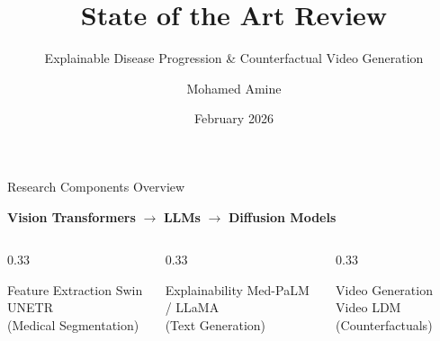 \documentclass[aspectratio=169]{beamer}
\title[State of the Art]{State of the Art Review}
\subtitle{Explainable Disease Progression \& Counterfactual Video Generation}
\author{Mohamed Amine}
\institute{TÉLUQ University $\cdot$ Mitacs Globalink}
\date{February 2026}
\begin{document}
\begin{frame}
    \titlepage
\end{frame}

\begin{frame}{Research Components Overview}
    \begin{center}
        \Large
        \textbf{Vision Transformers} $\rightarrow$ \textbf{LLMs} $\rightarrow$ \textbf{Diffusion Models}
    \end{center}
    
    \vspace{1em}
    
    \begin{columns}
        \begin{column}{0.33\textwidth}
            \begin{block}{Feature Extraction}
                \centering
                Swin UNETR \\
                (Medical Segmentation)
            \end{block}
        \end{column}
        \begin{column}{0.33\textwidth}
            \begin{block}{Explainability}
                \centering
                Med-PaLM / LLaMA \\
                (Text Generation)
            \end{block}
        \end{column}
        \begin{column}{0.33\textwidth}
            \begin{block}{Video Generation}
                \centering
                Video LDM \\
                (Counterfactuals)
            \end{block}
        \end{column}
    \end{columns}
\end{frame}
\end{document}
